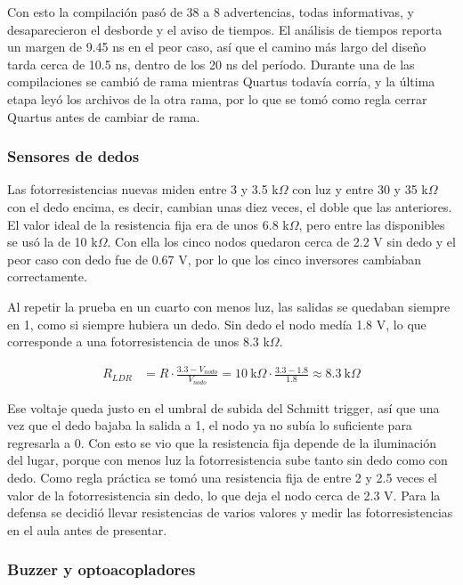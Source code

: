 \documentclass[11pt,letterpaper]{article}
\begin{document}
Con esto la compilación pasó de 38 a 8 advertencias, todas informativas, y desaparecieron el desborde y el aviso de tiempos. El análisis de tiempos reporta un margen de 9.45 ns en el peor caso, así que el camino más largo del diseño tarda cerca de 10.5 ns, dentro de los 20 ns del período. Durante una de las compilaciones se cambió de rama mientras Quartus todavía corría, y la última etapa leyó los archivos de la otra rama, por lo que se tomó como regla cerrar Quartus antes de cambiar de rama.

\subsubsection*{Sensores de dedos}

Las fotorresistencias nuevas miden entre 3 y 3.5 k$\Omega$ con luz y entre 30 y 35 k$\Omega$ con el dedo encima, es decir, cambian unas diez veces, el doble que las anteriores. El valor ideal de la resistencia fija era de unos 6.8 k$\Omega$, pero entre las disponibles se usó la de 10 k$\Omega$. Con ella los cinco nodos quedaron cerca de 2.2 V sin dedo y el peor caso con dedo fue de 0.67 V, por lo que los cinco inversores cambiaban correctamente.

Al repetir la prueba en un cuarto con menos luz, las salidas se quedaban siempre en 1, como si siempre hubiera un dedo. Sin dedo el nodo medía 1.8 V, lo que corresponde a una fotorresistencia de unos 8.3 k$\Omega$.

\begin{align*}
R_{LDR} &= R \cdot \frac{3.3 - V_{nodo}}{V_{nodo}} = 10\ \text{k}\Omega \cdot \frac{3.3 - 1.8}{1.8} \approx 8.3\ \text{k}\Omega
\end{align*}

Ese voltaje queda justo en el umbral de subida del Schmitt trigger, así que una vez que el dedo bajaba la salida a 1, el nodo ya no subía lo suficiente para regresarla a 0. Con esto se vio que la resistencia fija depende de la iluminación del lugar, porque con menos luz la fotorresistencia sube tanto sin dedo como con dedo. Como regla práctica se tomó una resistencia fija de entre 2 y 2.5 veces el valor de la fotorresistencia sin dedo, lo que deja el nodo cerca de 2.3 V. Para la defensa se decidió llevar resistencias de varios valores y medir las fotorresistencias en el aula antes de presentar.

\subsubsection*{Buzzer y optoacopladores}
\end{document}
